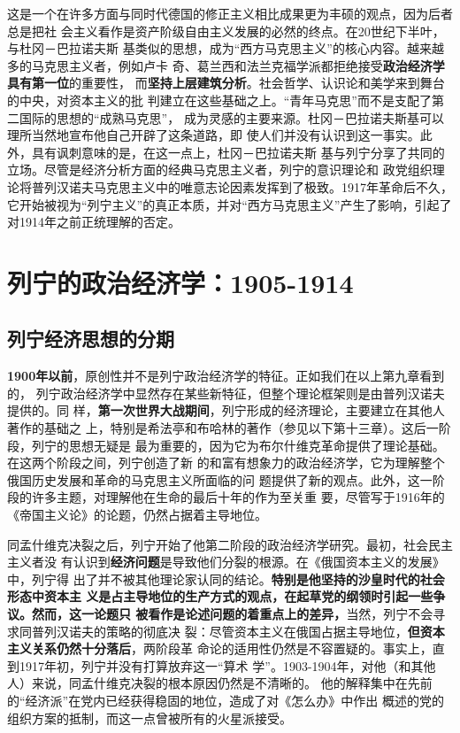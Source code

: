 这是一个在许多方面与同时代德国的修正主义相比成果更为丰硕的观点，因为后者总是把社
会主义看作是资产阶级自由主义发展的必然的终点。在20世纪下半叶，与杜冈－巴拉诺夫斯
基类似的思想，成为“西方马克思主义”的核心内容。越来越多的马克思主义者，例如卢卡
奇、葛兰西和法兰克福学派都拒绝接受\textbf{政治经济学具有第一位}的重要性，
而\textbf{坚持上层建筑分析}。社会哲学、认识论和美学来到舞台的中央，对资本主义的批
判建立在这些基础之上。“青年马克思”而不是支配了第二国际的思想的“成熟马克思”，
成为灵感的主要来源。杜冈－巴拉诺夫斯基可以理所当然地宣布他自己开辟了这条道路，即
使人们并没有认识到这一事实。此外，具有讽刺意味的是，在这一点上，杜冈－巴拉诺夫斯
基与列宁分享了共同的立场。尽管是经济分析方面的经典马克思主义者，列宁的意识理论和
政党组织理论将普列汉诺夫马克思主义中的唯意志论因素发挥到了极致。1917年革命后不久，
它开始被视为“列宁主义”的真正本质，并对“西方马克思主义”产生了影响，引起了
对1914年之前正统理解的否定。

\chapter{列宁的政治经济学：1905-1914}

\section{列宁经济思想的分期}
\textbf{1900年以前}，原创性并不是列宁政治经济学的特征。正如我们在以上第九章看到的，
列宁政治经济学中显然存在某些新特征，但整个理论框架则是由普列汉诺夫提供的。同
样，\textbf{第一次世界大战期间}，列宁形成的经济理论，主要建立在其他人著作的基础之
上，特别是希法亭和布哈林的著作（参见以下第十三章）。这后一阶段，列宁的思想无疑是
最为重要的，因为它为布尔什维克革命提供了理论基础。在这两个阶段之间，列宁创造了新
的和富有想象力的政治经济学，它为理解整个俄国历史发展和革命的马克思主义所面临的问
题提供了新的观点。此外，这一阶段的许多主题，对理解他在生命的最后十年的作为至关重
要，尽管写于1916年的《帝国主义论》的论题，仍然占据着主导地位。

同孟什维克决裂之后，列宁开始了他第二阶段的政治经济学研究。最初，社会民主主义者没
有认识到\textbf{经济问题}是导致他们分裂的根源。在《俄国资本主义的发展》中，列宁得
出了并不被其他理论家认同的结论。\textbf{特别是他坚持的沙皇时代的社会形态中资本主
  义是占主导地位的生产方式的观点，在起草党的纲领时引起一些争议。然而，这一论题只
  被看作是论述问题的着重点上的差异，}当然，列宁不会寻求同普列汉诺夫的策略的彻底决
裂：尽管资本主义在俄国占据主导地位，\textbf{但资本主义关系仍然十分落后}，两阶段革
命论的适用性仍然是不容置疑的。事实上，直到1917年初，列宁并没有打算放弃这一“算术
学”。1903-1904年，对他（和其他人）来说，同孟什维克决裂的根本原因仍然是不清晰的。
他的解释集中在先前的“经济派”在党内已经获得稳固的地位，造成了对《怎么办》中作出
概述的党的组织方案的抵制，而这一点曾被所有的火星派接受。

